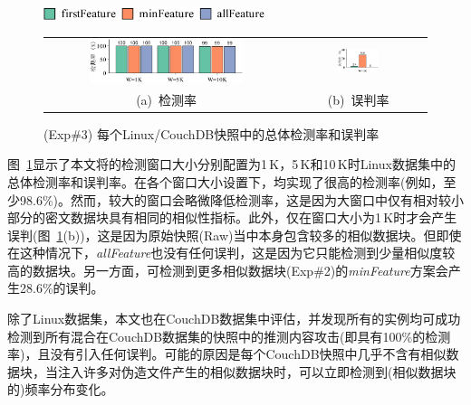 \begin{figure}[!htb]
    \centering
    \includegraphics[height=10.5pt]{pic/featurespy/plot/detection/overall/effectiveness-falsePositive_legend.pdf}
    \vspace{5pt}\\
    \begin{tabular}{@{\ }c@{\ }c}
        \includegraphics[width=0.66\textwidth]{pic/featurespy/plot/detection/overall/effectivenessLinux.pdf} &
        \includegraphics[width=0.33\textwidth]{pic/featurespy/plot/detection/overall/falsePositiveLinux.pdf}   \\
        \mbox{\small (a) 检测率}                                                                             &
        \mbox{\small (b) 误判率}                                                                               \\
    \end{tabular}
    \caption{(Exp\#3) 每个Linux/CouchDB快照中的总体检测率和误判率}
    \label{fig:featurespy-expDetectionOverallFalsePositive}
\end{figure}

图~\ref{fig:featurespy-expDetectionOverallFalsePositive}显示了本文将\sysnameF 的检测窗口大小分别配置为1\,K，5\,K和10\,K时Linux数据集中的总体检测率和误判率。在各个窗口大小设置下，\sysnameF 均实现了很高的检测率(例如，至少98.6\%)。然而，较大的窗口会略微降低检测率，这是因为大窗口中仅有相对较小部分的密文数据块具有相同的相似性指标。此外，\sysnameF 仅在窗口大小为1\,K时才会产生误判(图~\ref{fig:featurespy-expDetectionOverallFalsePositive}(b))，这是因为原始快照(Raw)当中本身包含较多的相似数据块。但即使在这种情况下，\textit{allFeature}也没有任何误判，这是因为它只能检测到少量相似度较高的数据块。另一方面，可检测到更多相似数据块(Exp\#2)的\textit{minFeature}方案会产生28.6\%的误判。

除了Linux数据集，本文也在CouchDB数据集中评估\sysnameF，并发现所有\sysnameF 的实例均可成功检测到所有混合在CouchDB数据集的快照中的推测内容攻击(即具有100\%的检测率)，且没有引入任何误判。可能的原因是每个CouchDB快照中几乎不含有相似数据块，当注入许多对伪造文件产生的相似数据块时，\sysnameF 可以立即检测到(相似数据块的)频率分布变化。

